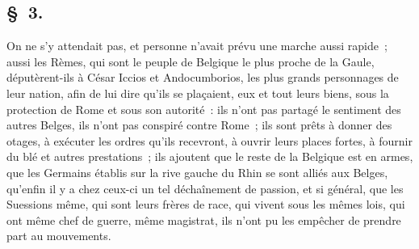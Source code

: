 \documentclass[french,twoside]{book} %
\begin{document}
\subsection[{§ 3.}]{ \textsc{§ 3.} }
\noindent On ne s’y attendait pas, et personne n’avait prévu une marche aussi rapide ; aussi les Rèmes, qui sont le peuple de Belgique le plus proche de la Gaule, députèrent-ils à César Iccios et Andocumborios, les plus grands personnages de leur nation, afin de lui dire qu’ils se plaçaient, eux et tout leurs biens, sous la protection de Rome et sous son autorité : ils n’ont pas partagé le sentiment des autres Belges, ils n’ont pas conspiré contre Rome ; ils sont prêts à donner des otages, à exécuter les ordres qu’ils recevront, à ouvrir leurs places fortes, à fournir du blé et autres prestations ; ils ajoutent que le reste de la Belgique est en armes, que les Germains établis sur la rive gauche du Rhin se sont alliés aux Belges, qu’enfin il y a chez ceux-ci un tel déchaînement de passion, et si général, que les Suessions même, qui sont leurs frères de race, qui vivent sous les mêmes lois, qui ont même chef de guerre, même magistrat, ils n’ont pu les empêcher de prendre part au mouvements.
\end{document}
